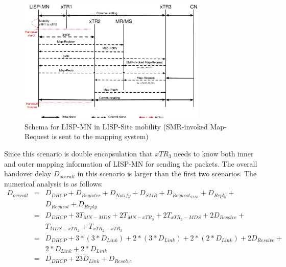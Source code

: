 \begin{figure}[!th]
	\centering
	\includegraphics[width=0.8\textwidth]{Pics/Mobility_double_encap_schema_SMR_askMDS_simplify}
	\caption{Schema for LISP-MN in LISP-Site mobility (SMR-invoked Map-Request is sent to the mapping system)}
	\label{Mobility_double_encap_schema_SMR_askMDS_simplify}
\end{figure}

Since this scenario is double encapsulation that $xTR_3$ needs to know both inner and outer mapping information of LISP-MN for sending the packets. The overall handover delay $D_{overall}$ in this scenario is larger than the first two scenarios. The numerical analysis is as follows:
\begin{eqnarray}
D_{overall} &=& D_{DHCP} + D_{Register} + D_{Notify} + D_{SMR} + D_{Request_{SMR}} + D_{Reply} +  \nonumber \\
& & D_{Request}+ D_{Reply} \nonumber \\
&=& D_{DHCP} + 3T_{MN-MDS} + 2T_{MN-xTR_3} + 2T_{xTR_3-MDS} + 2D_{Resolve} +   \nonumber \\
& & T_{MDS-xTR_2} + T_{xTR_2-xTR_3}   \nonumber \\
&=& D_{DHCP} + 3* (3*D_{Link}) + 2*(3*D_{Link}) + 2*(2*D_{Link}) + 2D_{Resolve} +  \nonumber \\
& & 2*D_{Link} + 2*D_{Link} \nonumber \\
&=& D_{DHCP} + 23D_{Link} + D_{Resolve} 
\end{eqnarray}

